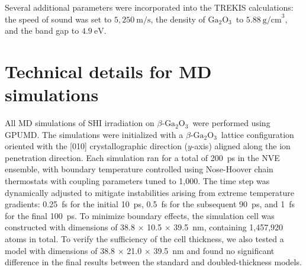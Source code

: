 \documentclass[aip,graphicx,amsmath,amssymb]{revtex4-1}
\newcommand{\ga}{$\text{Ga}_2\text{O}_3$}
\begin{document}
Several additional parameters were incorporated into the TREKIS calculations: 
the speed of sound was set to $5,250~\mathrm{m/s}$,\cite{wright_acoustic_2025} the density 
of \ga\ to $5.88~\mathrm{g/cm}^3$, and the band gap to 
$4.9~\mathrm{eV}$.\cite{zhang_tight-binding_2022} 

\section{Technical details for MD simulations}
\label{app:md}
All MD simulations of SHI irradiation on $\beta$-\ga\ were performed using GPUMD. 
The simulations were initialized with a $\beta$-\ga\ lattice configuration oriented with the 
[010] crystallographic direction ($y$-axis) aligned along the ion penetration direction. 
Each simulation ran for a total of 200~ps in the NVE ensemble, with boundary temperature 
controlled using Nose-Hoover chain thermostats with coupling parameters tuned to 1,000. 
The time step was dynamically adjusted to mitigate instabilities arising from extreme 
temperature gradients: 0.25~fs for the initial 10~ps, 0.5~fs for the subsequent 90~ps, 
and 1~fs for the final 100~ps. 
To minimize boundary effects, the simulation cell was constructed with dimensions of 
38.8 $\times$ 10.5 $\times$ 39.5~nm, containing 1,457,920 atoms in total. 
To verify the sufficiency of the cell thickness, we also tested a model with dimensions of 
38.8 $\times$ 21.0 $\times$ 39.5~nm and found no significant difference in the final 
results between the standard and doubled-thickness models. 

\end{document}
